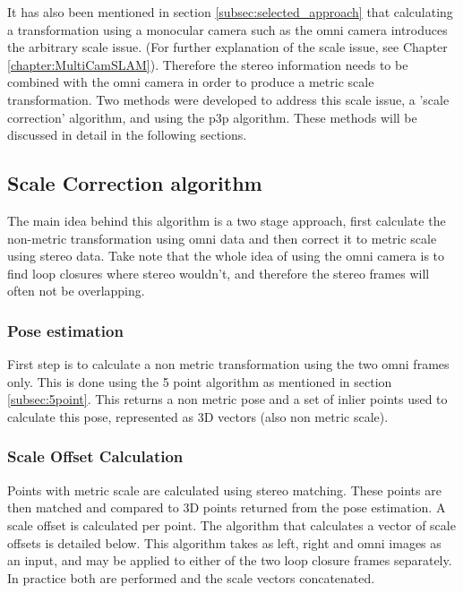 It has also been mentioned in section \ref{subsec:selected_approach} that calculating a transformation using a monocular camera such as the omni camera introduces the arbitrary scale issue.  (For further explanation of the scale issue, see Chapter \ref{chapter:MultiCamSLAM}). Therefore the stereo information needs to be combined with the omni camera in order to produce a metric scale transformation.  Two methods were developed to address this scale issue, a 'scale correction' algorithm, and using the p3p algorithm.  These methods will be discussed in detail in the following sections.

\subsection{Scale Correction algorithm}

The main idea behind this algorithm is a two stage approach, first calculate the non-metric transformation using omni data and then correct it to metric scale using stereo data.  Take note that the whole idea of using the omni camera is to find loop closures where stereo wouldn't, and therefore the stereo frames will often not be overlapping.

\subsubsection{Pose estimation}

First step is to calculate a non metric transformation using the two omni frames only.  This is done using the 5 point algorithm as mentioned in section \ref{subsec:5point}.  This returns a non metric pose and a set of inlier points used to calculate this pose, represented as 3D vectors (also non metric scale).

\subsubsection{Scale Offset Calculation}

Points with metric scale are calculated using stereo matching.  These points are then matched and compared to 3D points returned from the pose estimation.  A scale offset is calculated per point.  The algorithm that calculates a vector of scale offsets is detailed below.  This algorithm takes as left, right and omni images as an input, and may be applied to either of the two loop closure frames separately.  In practice both are performed and the scale vectors concatenated. 

